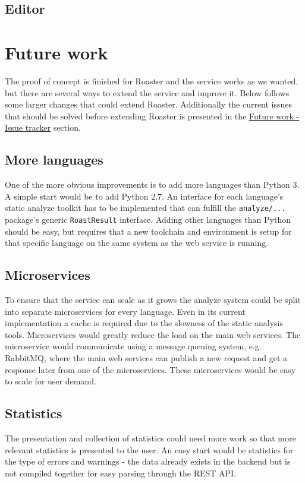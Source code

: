 \documentclass[12pt,a4paper]{report}
\begin{document}
\section{Editor}

\chapter{Future work}
\label{sec:future-work}
The proof of concept is finished for Roaster and the service works as we wanted, but there are several ways to extend the service and improve it. Below follows some larger changes that could extend Roaster. Additionally the current issues that should be solved before extending Roaster is presented in the \hyperref[sec:issue-tracker]{Future work - Issue tracker} section.

\section{More languages}
One of the more obvious improvements is to add more languages than Python 3. A simple start would be to add Python 2.7. An interface for each language's static analyze toolkit has to be implemented that can fulfill the \texttt{analyze/...} package's generic \texttt{RoastResult} interface. Adding other languages than Python should be easy, but requires that a new toolchain and environment is setup for that specific language on the same system as the web service is running.

\section{Microservices}
To ensure that the service can scale as it grows the analyze system could be split into separate microservices for every language. Even in its current implementation a cache is required due to the slowness of the static analysis tools. Microservices would greatly reduce the load on the main web services. The microservice would communicate using a message queuing system, e.g. RabbitMQ, where the main web services can publish a new request and get a response later from one of the microservices. These microservices would be easy to scale for user demand.

\section{Statistics}
The presentation and collection of statistics could need more work so that more relevant statistics is presented to the user. An easy start would be statistics for the type of errors and warnings - the data already exists in the backend but is not compiled together for easy parsing through the REST API.
\end{document}
